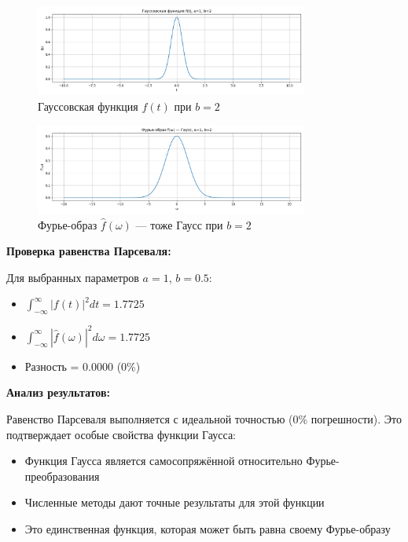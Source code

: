 \begin{figure}[H]
    \centering
    \includegraphics[width=0.8\textwidth]{python/gauss_function_b2.png}
    \caption{Гауссовская функция $f(t)$ при $b = 2$}
\end{figure}

\begin{figure}[H]
    \centering
    \includegraphics[width=0.8\textwidth]{python/gauss_fourier_b2.png}
    \caption{Фурье-образ $\hat{f}(\omega)$ — тоже Гаусс при $b = 2$}
\end{figure}

\textbf{Проверка равенства Парсеваля:}

Для выбранных параметров $a = 1$, $b = 0.5$:
\begin{itemize}
    \item $\displaystyle \int_{-\infty}^{\infty} |f(t)|^2 dt = 1.7725$
    \item $\displaystyle \int_{-\infty}^{\infty} |\hat{f}(\omega)|^2 d\omega = 1.7725$
    \item Разность = $0.0000$ (0\%)
\end{itemize}

\textbf{Анализ результатов:}

Равенство Парсеваля выполняется с идеальной точностью (0\% погрешности). Это подтверждает особые свойства функции Гаусса:
\begin{itemize}
    \item Функция Гаусса является самосопряжённой относительно Фурье-преобразования
    \item Численные методы дают точные результаты для этой функции
    \item Это единственная функция, которая может быть равна своему Фурье-образу
\end{itemize}

